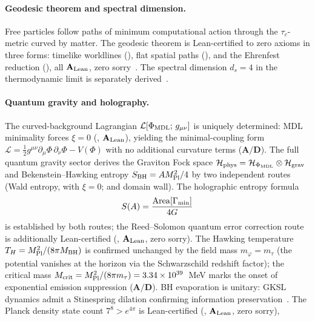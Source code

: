 \paragraph{Geodesic theorem and spectral dimension.}
Free particles follow paths of minimum computational action through the
$\tau_c$-metric curved by matter.  The geodesic theorem is Lean-certified to zero
axioms in three forms: timelike worldlines
(), flat spatial paths
(), and the Ehrenfest reduction
(), all $\mathbf{A}_{\rm Lean}$, zero
sorry~\cite{SpivackCompleteness}.  The spectral dimension $d_s = 4$ in the
thermodynamic limit is separately derived~\cite{SpivackEmergentGravity}.

\paragraph{Quantum gravity and holography.}
The curved-background Lagrangian $\mathcal{L}[\Phi_{\rm MDL};\,g_{\mu\nu}]$ is uniquely
determined: MDL minimality forces $\xi = 0$
(, $\mathbf{A}_{\rm Lean}$), yielding the
minimal-coupling form
$\mathcal{L} = \tfrac{1}{2}g^{\mu\nu}\partial_\mu\Phi\,\partial_\nu\Phi - V(\Phi)$
with no additional curvature terms ($\mathbf{A/D}$).  The full quantum gravity sector
derives the Graviton Fock space
$\mathcal{H}_{\rm phys} = \mathcal{H}_{\Phi_{\rm MDL}} \otimes \mathcal{H}_{\rm grav}$
and Bekenstein--Hawking entropy $S_{\rm BH} = A M_{\rm Pl}^2/4$ by two independent
routes (Wald entropy, with $\xi = 0$; and domain wall).  The holographic entropy
formula
\[
  S(A) = \frac{\mathrm{Area}[\Gamma_{\rm min}]}{4G}
\]
is established by both routes; the Reed--Solomon quantum error correction route is
additionally Lean-certified
(, $\mathbf{A}_{\rm Lean}$, zero sorry).
The Hawking temperature $T_H = M_{\rm Pl}^2/(8\pi M_{\rm BH})$ is confirmed unchanged
by the field mass $m_\varphi = m_\tau$ (the potential vanishes at the horizon via the
Schwarzschild redshift factor); the critical mass
$M_{\rm crit} = M_{\rm Pl}^2/(8\pi m_\tau) = 3.34 \times 10^{39}$~MeV marks the
onset of exponential emission suppression ($\mathbf{A/D}$).  BH evaporation is unitary:
GKSL dynamics admit a Stinespring dilation confirming information
preservation~\cite{SpivackBHUnitarity}.
The Planck density state count $7^8 > e^{4\pi}$ is Lean-certified
(, $\mathbf{A}_{\rm Lean}$, zero sorry),
